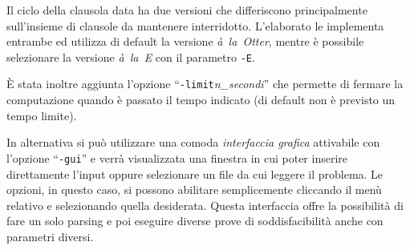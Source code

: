 \documentclass[a4paper,11pt]{article} %
\newcommand{\sintassi}{\texttt}
\begin{document}
Il ciclo della clausola data ha due versioni che differiscono principalmente
sull'insieme di clausole da mantenere interridotto. L'elaborato le implementa
entrambe ed utilizza di default la versione \emph{à~la~Otter}, mentre è possibile
selezionare la versione \emph{à~la~E} con il parametro \sintassi{-E}.

\`E stata inoltre aggiunta l'opzione ``\sintassi{-limit}\emph{n\_secondi}'' che permette 
di fermare la computazione quando è passato il tempo indicato (di default non è
previsto un tempo limite).


In alternativa si può utilizzare una comoda
\emph{interfaccia grafica} 
attivabile con l'opzione ``\sintassi{-gui}'' e verrà visualizzata una finestra 
in cui poter inserire
direttamente l'input oppure selezionare un file da cui leggere il problema.
Le opzioni, in questo caso, si possono abilitare semplicemente cliccando
il menù relativo e selezionando quella desiderata.
Questa interfaccia offre la possibilità di fare un solo parsing
e poi eseguire diverse prove di soddisfacibilità anche con parametri diversi.
\end{document}
